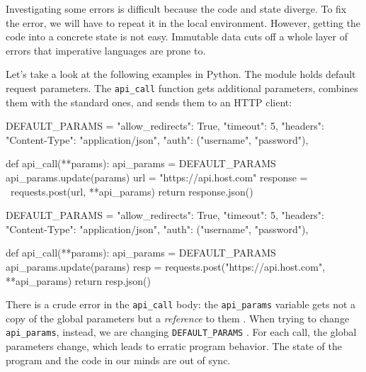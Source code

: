 Investigating some errors is difficult because the code and state diverge. To fix the error, we will have to repeat it in the local environment. However, getting the code into a concrete state is not easy. Immutable data cuts off a whole layer of errors that imperative languages are prone to.


Let’s take a look at the following examples in Python. The module holds default request parameters. The \verb|api_call| function gets additional parameters, combines them with the standard ones, and sends them to an HTTP client:

\ifx\DEVICETYPE\MOBILE

\begin{english}
  \begin{python/lines}
DEFAULT_PARAMS = {
    "allow_redirects": True,
    "timeout": 5,
    "headers": {"Content-Type":
                "application/json"},
    "auth": ("username", "password"),
}

def api_call(**params):
    api_params = DEFAULT_PARAMS
    api_params.update(params)
    url = "https://api.host.com"
    response = \
      requests.post(url, **api_params)
    return response.json()
  \end{python/lines}
\end{english}

\else

\begin{english}
  \begin{python/lines}
DEFAULT_PARAMS = {
    "allow_redirects": True,
    "timeout": 5,
    "headers": {"Content-Type": "application/json"},
    "auth": ("username", "password"),
}

def api_call(**params):
    api_params = DEFAULT_PARAMS
    api_params.update(params)
    resp = requests.post("https://api.host.com", **api_params)
    return resp.json()
  \end{python/lines}
\end{english}

\fi


There is a crude error in the \verb|api_call| body: the \verb|api_params| variable gets not a copy of the global parameters but a \emph{reference} to them \ifx\DEVICETYPE\MOBILE{}\else{}\fi. When trying to change \verb|api_params|, instead, we are changing \verb|DEFAULT_PARAMS|
\ifx\DEVICETYPE\MOBILE\coderef{11}\else\coderef{10}\fi. For each call, the global parameters change, which leads to erratic program behavior.
The state of the program and the code in our minds are out of sync.

